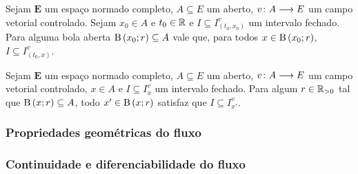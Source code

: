 \begin{proposition}
Sejam $\bm E$ um espaço normado completo, $A \subseteq E$ um aberto, $v\colon \allowbreak A \longrightarrow E$ um campo vetorial controlado. Sejam $x_0 \in A$ e $t_0 \in \mathbb{R}$ e $I \subseteq I^v_{(t_0,x_0)}$ um intervalo fechado. Para alguma bola aberta $\mathrm{B}\left(x_0; r\right) \subseteq A$ vale que, para todos $x \in \mathrm{B}\left(x_0; r\right)$, $I \subseteq I^v_{(t_0,x)}$.
\end{proposition}

\begin{proposition}
Sejam $\bm E$ um espaço normado completo, $A \subseteq E$ um aberto, $v\colon \allowbreak A \longrightarrow E$ um campo vetorial controlado, $x \in A$ e $I \subseteq I^v_x$ um intervalo fechado. Para algum $r \in \mathbb{R}_{>0}$ tal que $\mathrm{B}\left(x; r\right) \subseteq A$, todo $x' \in \mathrm{B}\left(x; r\right)$ satisfaz que $I \subseteq I^v_{x'}$.
\end{proposition}





\subsubsection{Propriedades geométricas do fluxo}


\subsubsection{Continuidade e diferenciabilidade do fluxo}






















































